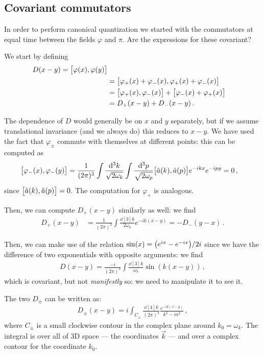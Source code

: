 \documentclass[main.tex]{subfiles}
\begin{document}
\subsection{Covariant commutators}

In order to perform canonical quantization we started with the commutators at equal time between the fields \(\varphi \) and \(\pi \). 
Are the expressions for these covariant? 

We start by defining 
%
\begin{align}
D(x - y) = \qty[\varphi (x), \varphi (y)]  \\
&= \qty[\varphi_{+} (x) + \varphi_{-} (x), \varphi_{+} (x) + \varphi_{-} (x)]  \\
&= \qty[\varphi_{+} (x), \varphi_{-} (x)] + \qty[\varphi_{-} (x) + \varphi_{+} (x)]  \\
&= D_+ (x-y) + D_- (x-y)
\,.
\end{align}

The dependence of \(D\) would generally be on \(x\) and \(y\) separately, but if we assume translational invariance (and we always do) this reduces to \(x-y\).
We have used the fact that \(\varphi_{\pm}\) commute with themselves at different points: this can be computed as 
%
\begin{align}
\qty[\varphi_{-}(x) , \varphi_{-}(y)] &=
\frac{1}{(2\pi )^{3}} \int \frac{ \dd[3]{k}}{\sqrt{2 \omega_{k}}}
\int \frac{\dd[3]{p}}{\sqrt{2 \omega_{p}}} 
\qty[\hat{a}(k), \hat{a}(p)] e^{-ikx} e^{-ipy} = 0
\,,
\end{align}
%
since \(\qty[\hat{a}(k), \hat{a}(p)] = 0\). The computation for \(\varphi_{+}\) is analogous. 

Then, we can compute \(D_{+} (x-y)\) similarly as well: we find 
%
\begin{align}
D_{+} (x-y) &= \frac{1}{(2\pi )^3} \int \frac{ \dd[3]{k} }{2 \omega_{k}}
e^{-ik(x-y)} = - D_{-} (y-x)  
\,.
\end{align}

Then, we can make use of the relation \(\sin(x) = \qty(e^{ix} - e^{-ix}) / 2i\) since we have the difference of two exponentials with opposite arguments: we find 
%
\begin{align}
D(x-y) = \frac{-i}{(2 \pi )^3}
\int \frac{ \dd[3]{k}}{\omega_{k}} \sin(k (x-y))
\,,
\end{align}
%
which is covariant, but not \emph{manifestly} so: we need to manipulate it to see it.

\begin{claim}
The two \(D_{\pm } \) can be written as: 
%
\begin{align}
    D_{\pm } (x-y) = i \int_{C_{\pm}} \frac{ \dd[4]{k}}{(2 \pi )^{4}} \frac{e^{-ik(x-y)}}{k^2- m^2}
    \,,
\end{align}
%
where \(C_{\pm}\) is a small clockwise contour in the complex plane around \(k_0 = \omega_{k}\). The integral is over all of 3D space --- the coordinates \(\vec{k}\) --- and over a complex contour for the coordinate \(k_0 \). 
\end{claim}
\end{document}
